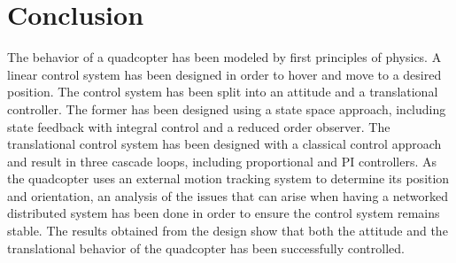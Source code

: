 \section{Conclusion}\label{sec:conclusion}
The behavior of a quadcopter has been modeled by first principles of physics. A linear control system has been designed in order to hover and move to a desired position.
The control system has been split into an attitude and a translational controller. The former has been designed using a state space approach, including state feedback with integral control and a reduced order observer. The translational control system has been designed with a classical control approach and result in three cascade loops, including proportional and PI controllers. 
As the quadcopter uses an external motion tracking system to determine its position and orientation, an analysis of the issues that can arise when having a networked distributed system has been done in order to ensure the control system remains stable. The results obtained from the design show that both the attitude and the translational behavior of the quadcopter has been successfully controlled.

